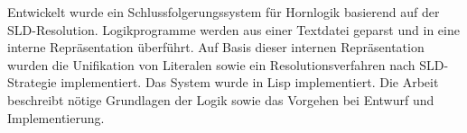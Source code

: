 \kurzfassung

Entwickelt wurde ein Schlussfolgerungssystem für Hornlogik basierend auf der SLD-Resolution. Logikprogramme werden aus einer Textdatei geparst und in eine interne Repräsentation überführt. Auf Basis dieser internen Repräsentation wurden die Unifikation von Literalen sowie ein Resolutionsverfahren nach SLD-Strategie implementiert. Das System wurde in Lisp implementiert. Die Arbeit beschreibt nötige Grundlagen der Logik sowie das Vorgehen bei Entwurf und Implementierung.
